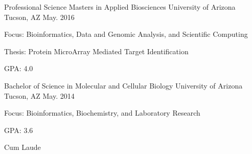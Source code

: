

\begin{cventries}

  \cventry
    {Professional Science Masters in Applied Biosciences} %
    {University of Arizona} %
    {Tucson, AZ} %
    {May. 2016} %
    {
      \begin{cvitems} %
        \item {Focus: Bioinformatics, Data and Genomic Analysis, and Scientific Computing}
        \item {Thesis: Protein MicroArray Mediated Target Identification}
        \item {GPA: 4.0}
      \end{cvitems}
    }
  \cventry
    {Bachelor of Science in Molecular and Cellular Biology} %
    {University of Arizona} %
    {Tucson, AZ} %
    {May. 2014} %
    {
      \begin{cvitems} %
        \item {Focus: Bioinformatics, Biochemistry, and Laboratory Research}
        \item {GPA: 3.6}
        \item {Cum Laude}
      \end{cvitems}
    }
\end{cventries}
